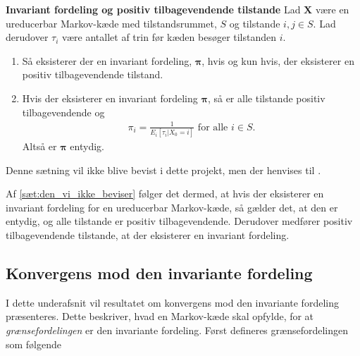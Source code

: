 \begin{minipage}\textwidth
\begin{thmx} \label{sæt:den_vi_ikke_beviser}\textbf{Invariant fordeling og positiv tilbagevendende tilstande} %
\newline
Lad $\bm X$ være en ureducerbar Markov-kæde med tilstandsrummet, $S$ og tilstande $i, j\in S$. Lad derudover $\tau_i$ være antallet af trin før kæden besøger tilstanden $i$.
\begin{enumerate}
    \item Så eksisterer der en invariant fordeling, $\bm \pi$, hvis og kun hvis, der eksisterer en positiv tilbagevendende tilstand.
    \item Hvis der eksisterer en invariant fordeling $\bm \pi$, så er alle tilstande positiv tilbagevendende og
    \begin{align*}
        \pi_i = \frac{1}{E_i[\tau_i|X_0 = i]} \text{ for alle } i\in S. 
    \end{align*}
Altså er $\bm\pi$ entydig. 
\end{enumerate}
\end{thmx}
\end{minipage}

Denne sætning vil ikke blive bevist i dette projekt, men der henvises til \citep[s. 233-234]{oxford}. 

Af \autoref{sæt:den_vi_ikke_beviser} følger det dermed, at hvis der eksisterer en invariant fordeling for en ureducerbar Markov-kæde, så gælder det, at den er entydig, og alle tilstande er positiv tilbagevendende. Derudover medfører positiv tilbagevendende tilstande, at der eksisterer en invariant fordeling. 

\subsection{Konvergens mod den invariante fordeling}
I dette underafsnit vil resultatet om konvergens mod den invariante fordeling præsenteres. Dette beskriver, hvad en Markov-kæde skal opfylde, for at \textit{grænsefordelingen} er den invariante fordeling. Først defineres grænsefordelingen som følgende


